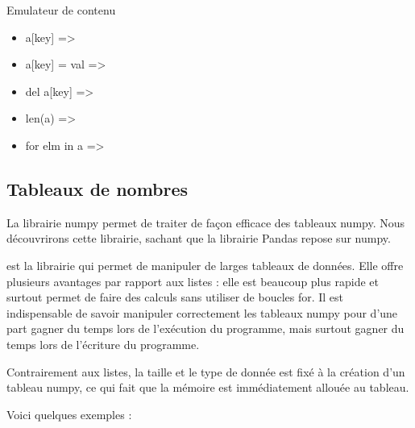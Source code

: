 \documentclass[letterpaper,10pt,english]{sphinxhowto}
\begin{document}
\sphinxAtStartPar
Emulateur de contenu
\begin{itemize}
\item {} 
\sphinxAtStartPar
a{[}key{]} => 

\item {} 
\sphinxAtStartPar
a{[}key{]} = val => 

\item {} 
\sphinxAtStartPar
del a{[}key{]} => 

\item {} 
\sphinxAtStartPar
len(a) => 

\item {} 
\sphinxAtStartPar
for elm in a => 

\end{itemize}


\subsection{Tableaux de nombres}
\label{\detokenize{cours5_numpy_cours:tableaux-de-nombres}}\label{\detokenize{cours5_numpy_cours::doc}}
\sphinxAtStartPar
La librairie numpy permet de traiter de façon efficace des tableaux numpy. Nous découvrirons cette librairie, sachant que la librairie Pandas repose sur numpy.

\sphinxAtStartPar
{} est la librairie qui permet de manipuler de larges tableaux de données. Elle offre plusieurs avantages par rapport aux listes : elle est beaucoup plus rapide et surtout permet de faire des calculs sans utiliser de boucles for. Il est indispensable de savoir manipuler correctement les tableaux numpy pour d’une part gagner du temps lors de l’exécution du programme, mais surtout gagner du temps lors de l’écriture du programme.

\sphinxAtStartPar
Contrairement aux listes, la taille et le type de donnée est fixé à la création d’un tableau numpy, ce qui fait que la mémoire est immédiatement allouée au tableau.

\sphinxAtStartPar
Voici quelques exemples :

\begin{sphinxVerbatim}[commandchars=\\\{\}]
   

  
\end{sphinxVerbatim}
\end{document}
